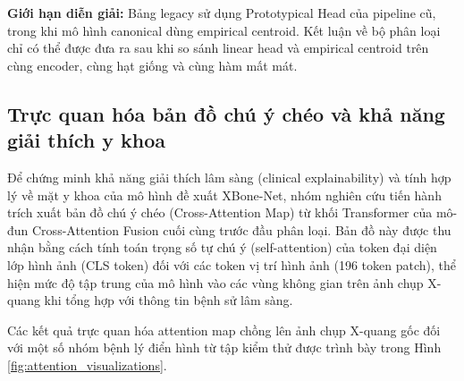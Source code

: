 \begin{table}[htbp]
\centering
{}
\end{table}

\textbf{Giới hạn diễn giải:} Bảng legacy sử dụng Prototypical Head của pipeline
cũ, trong khi mô hình canonical dùng empirical centroid. Kết luận về bộ phân
loại chỉ có thể được đưa ra sau khi so sánh linear head và empirical centroid
trên cùng encoder, cùng hạt giống và cùng hàm mất mát.

\subsection{Trực quan hóa bản đồ chú ý chéo và khả năng giải thích y khoa}
Để chứng minh khả năng giải thích lâm sàng (clinical explainability) và tính hợp lý về mặt y khoa của mô hình đề xuất XBone-Net, nhóm nghiên cứu tiến hành trích xuất bản đồ chú ý chéo (Cross-Attention Map) từ khối Transformer của mô-đun Cross-Attention Fusion cuối cùng trước đầu phân loại. Bản đồ này được thu nhận bằng cách tính toán trọng số tự chú ý (self-attention) của token đại diện lớp hình ảnh (CLS token) đối với các token vị trí hình ảnh (196 token patch), thể hiện mức độ tập trung của mô hình vào các vùng không gian trên ảnh chụp X-quang khi tổng hợp với thông tin bệnh sử lâm sàng.

Các kết quả trực quan hóa attention map chồng lên ảnh chụp X-quang gốc đối với một số nhóm bệnh lý điển hình từ tập kiểm thử được trình bày trong Hình \ref{fig:attention_visualizations}.

